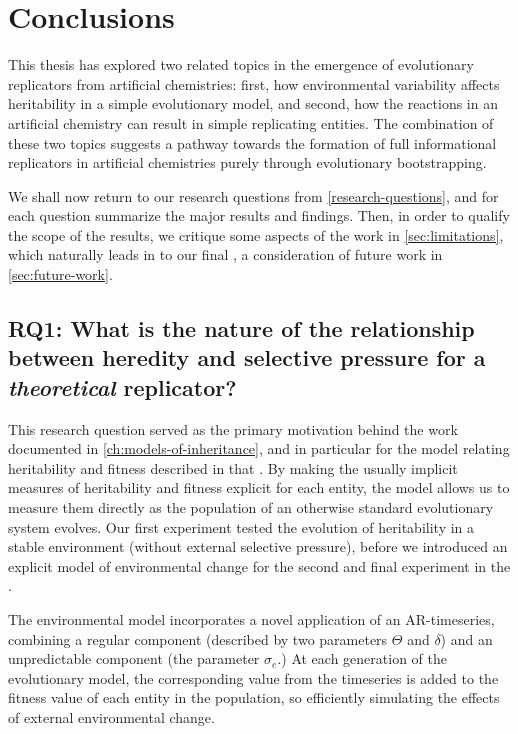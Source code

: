 \chapter{Conclusions}\label{ch:thesis-conclusions}

This thesis has explored two related topics in the emergence of evolutionary replicators from artificial chemistries: first, how environmental variability affects heritability in a simple evolutionary model, and second, how the reactions in an artificial chemistry can result in simple replicating entities. The combination of these two topics suggests a pathway towards the formation of full informational replicators in artificial chemistries purely through evolutionary bootstrapping.

We shall now return to our research questions from \cref{research-questions}, and for each question summarize the major results and findings. Then, in order to qualify the scope of the results, we critique some aspects of the work in \cref{sec:limitations}, which naturally leads in to our final , a consideration of future work in \cref{sec:future-work}.

\section{RQ1: What is the nature of the relationship between heredity and selective pressure for a \emph{theoretical} replicator?}

This research question served as the primary motivation behind the work documented in \cref{ch:models-of-inheritance}, and in particular for the model relating heritability and fitness described in that . By making the usually implicit measures of heritability and fitness explicit for each entity, the model allows us to measure them directly as the population of an otherwise standard evolutionary system evolves. Our first experiment tested the evolution of heritability in a stable environment (without external selective pressure), before we introduced an explicit model of environmental change for the second and final experiment in the . 

The environmental model incorporates a novel application of an AR-timeseries, combining a regular component (described by two parameters $\Theta$ and $\delta$) and an unpredictable component (the parameter $\sigma_e$.) At each generation of the evolutionary model, the corresponding value from the timeseries is added to the fitness value of each entity in the population, so efficiently simulating the effects of external environmental change.


